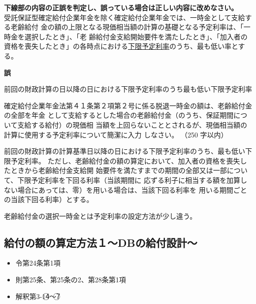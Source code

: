 \begin{truefalse}[年金1 H28 問題1(5)\textcircled{5}]
    \textbf{下線部の内容の正誤を判定し、誤っている場合は正しい内容に改めなさい。}
  \\  

受託保証型確定給付企業年金を除く確定給付企業年金では、一時金として支給する老齢給付
金の額の上限となる現価相当額の計算の基礎となる予定利率は、「一時金を選択したとき」、「老
齢給付金支給開始要件を満たしたとき」、「加入者の資格を喪失したとき」の各時点における\underline{下限予定利率}のうち、最も低い率とする。
\end{truefalse}

\begin{answerbox}
\textbf{誤}

前回の財政計算の日以降の日における下限予定利率のうち最も低い下限予定利率
\end{answerbox}


\begin{shortanswer}[年金1 2025 問題2(1)ア]
確定給付企業年金法第４１条第２項第２号に係る脱退一時金の額は、老齢給付金の全部を年金
として支給するとした場合の老齢給付金（のうち、保証期間について支給する給付）の現価相
当額を上回らないこととされるが、現価相当額の計算に使用する予定利率について簡潔に入力
しなさい。 （250 字以内）
\end{shortanswer}

\begin{answerbox}
前回の財政計算の計算基準日以降の日における下限予定利率のうち、最も低い下限予定利率。
ただし、老齢給付金の額の算定において、加入者の資格を喪失したときから老齢給付金支給開
始要件を満たすまでの期間の全部又は一部について、下限予定利率を下回る利率（当該期間に
応ずる利子に相当する額を加算しない場合にあっては、零）を用いる場合は、当該下回る利率を
用いる期間ごとの当該下回る利率）とする。  
\end{answerbox}

\begin{explanationbox}
  老齢給付金の選択一時金とは予定利率の設定方法が少し違う。
\end{explanationbox}

\newpage

\subsection{給付の額の算定方法１〜DBの給付設計〜}


\begin{InyouJobunbox}
  \begin{itemize}
    \item 令第24条第1項
    \item 則第25条、第25条の2、第28条第1項
    \item 解釈第3-1\textcircled{4}〜\textcircled{7}
  \end{itemize}
\end{InyouJobunbox}

